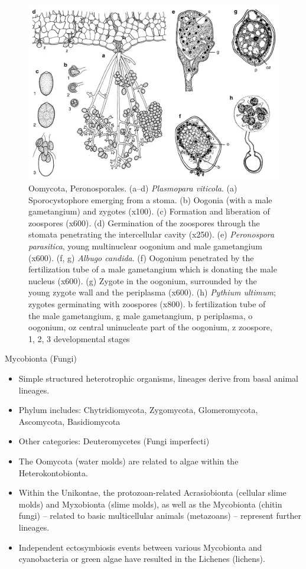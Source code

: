 \documentclass[ignorenonframetext,aspectratio=169]{beamer}
\providecommand{\tightlist}{%
  \setlength{\itemsep}{0pt}\setlength{\parskip}{0pt}}
\begin{document}
\begin{frame}{}
\protect\hypertarget{section-12}{}

\begin{figure}
\includegraphics[width=0.4\linewidth]{./../images/oomycota_peronosporales_structure} \caption{Oomycota, Peronosporales. (a–d) \textit{Plasmopara viticola}. (a) Sporocystophore emerging from a stoma. (b) Oogonia (with a male gametangium) and zygotes (x100). (c) Formation and liberation of zoospores (x600). (d) Germination of the zoospores through the stomata penetrating the intercellular cavity (x250). (e) \textit{Peronospora parasitica}, young multinuclear oogonium and male gametangium (x600). (f, g) \textit{Albugo candida}. (f) Oogonium penetrated by the fertilization tube of a male gametangium which is donating the male nucleus (x600). (g) Zygote in the oogonium, surrounded by the young zygote wall and the periplasma (x600). (h) \textit{Pythium ultimum}; zygotes germinating with zoospores (x800). b fertilization tube of the male gametangium, g male gametangium, p periplasma, o oogonium, oz central uninucleate part of the oogonium, z zoospore, 1, 2, 3 developmental stages}\label{fig:oomycota-peronosporales2}
\end{figure}

\end{frame}

\begin{frame}{Mycobionta (Fungi)}
\protect\hypertarget{mycobionta-fungi}{}

\begin{itemize}
\tightlist
\item
  Simple structured heterotrophic organisms, lineages derive from basal
  animal lineages.
\item
  Phylum includes: Chytridiomycota, Zygomycota, Glomeromycota,
  Ascomycota, Basidiomycota
\item
  Other categories: Deuteromycetes (Fungi imperfecti)
\item
  The Oomycota (water molds) are related to algae within the
  Heterokontobionta.
\item
  Within the Unikontae, the protozoan-related Acrasiobionta (cellular
  slime molds) and Myxobionta (slime molds), as well as the Mycobionta
  (chitin fungi) -- related to basic multicellular animals (metazoans)
  -- represent further lineages.
\item
  Independent ectosymbiosis events between various Mycobionta and
  cyanobacteria or green algae have resulted in the Lichenes (lichens).
\end{itemize}

\end{frame}
\end{document}
